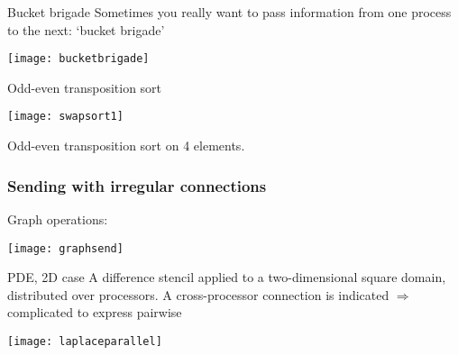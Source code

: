 \begin{optexerciseframe}[rightsend]
  
\end{optexerciseframe}

\begin{exerciseframe}[sendrecv]
  
\end{exerciseframe}

\begin{frame}{Bucket brigade}
  Sometimes you really want to pass information from one process to
  the next: `bucket brigade'

  \texttt{[image: bucketbrigade]}
\end{frame}

\begin{exerciseframe}[bucketblock]
  
\end{exerciseframe}

\begin{frame}{Odd-even transposition sort}
  \label{fig:swapsort1}

  \texttt{[image: swapsort1]}

  Odd-even transposition sort on 4 elements.
\end{frame}

\begin{optexerciseframe}
  \footnotesize
%
  
\end{optexerciseframe}


\begin{frame}[containsverbatim]\frametitle{Sending with irregular connections}
  Graph operations:
  
  \texttt{[image: graphsend]}
\end{frame}

  
\begin{frame}{PDE, 2D case}
    A difference stencil applied to a two-dimensional square
    domain, distributed over processors. A cross-processor connection
    is indicated $\Rightarrow$ complicated to express pairwise

    \texttt{[image: laplaceparallel]}
\end{frame}

